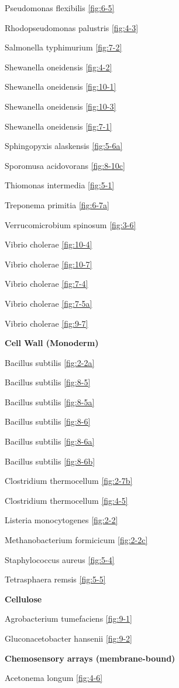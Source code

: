 \documentclass[]{tufte-book}
\begin{document}
Pseudomonas flexibilis \ref{fig:6-5}

Rhodopseudomonas palustris \ref{fig:4-3}

Salmonella typhimurium \ref{fig:7-2}

Shewanella oneidensis \ref{fig:4-2}

Shewanella oneidensis \ref{fig:10-1}

Shewanella oneidensis \ref{fig:10-3}

Shewanella oneidensis \ref{fig:7-1}

Sphingopyxis alaskensis \ref{fig:5-6a}

Sporomusa acidovorans \ref{fig:8-10c}

Thiomonas intermedia \ref{fig:5-1}

Treponema primitia \ref{fig:6-7a}

Verrucomicrobium spinosum \ref{fig:3-6}

Vibrio cholerae \ref{fig:10-4}

Vibrio cholerae \ref{fig:10-7}

Vibrio cholerae \ref{fig:7-4}

Vibrio cholerae \ref{fig:7-5a}

Vibrio cholerae \ref{fig:9-7}

\textbf{Cell Wall (Monoderm)}

Bacillus subtilis \ref{fig:2-2a}

Bacillus subtilis \ref{fig:8-5}

Bacillus subtilis \ref{fig:8-5a}

Bacillus subtilis \ref{fig:8-6}

Bacillus subtilis \ref{fig:8-6a}

Bacillus subtilis \ref{fig:8-6b}

Clostridium thermocellum \ref{fig:2-7b}

Clostridium thermocellum \ref{fig:4-5}

Listeria monocytogenes \ref{fig:2-2}

Methanobacterium formicicum \ref{fig:2-2c}

Staphylococcus aureus \ref{fig:5-4}

Tetrasphaera remsis \ref{fig:5-5}

\textbf{Cellulose}

Agrobacterium tumefaciens \ref{fig:9-1}

Gluconacetobacter hansenii \ref{fig:9-2}

\textbf{Chemosensory arrays (membrane-bound)}

Acetonema longum \ref{fig:4-6}
\end{document}
